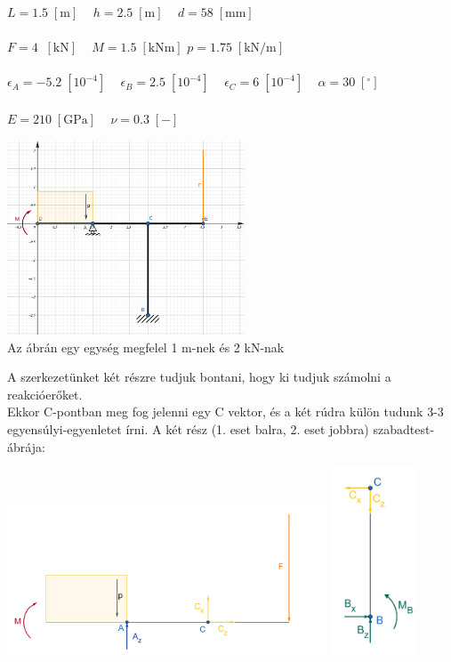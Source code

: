 \documentclass[10pt, a4paper]{article}
\newcommand{\adat}{\begin{trivlist}\item[\hskip \labelsep {\bfseries 
			{Adatok:}}]\end{trivlist}}
\newcommand{\egy}{\begin{trivlist}\item[\hskip \labelsep {\bfseries 
			{1. Feladat:}}]\end{trivlist}}
\newcommand{\knm}{\;\mathrm{\left[kNm\right]}}
\newcommand{\kn}{\;\mathrm{\left[kN\right]}}
\newcommand{\meter}{\mathrm{\left[m\right]}}
\newcommand{\pknm}{\mathrm{\left[kN/m\right]}}
\newcommand{\mm}{\mathrm{\left[mm\right]}}
\newcommand{\minegy}{\mathrm{\left[10^{-4}\right]}}
\newcommand{\dimnel}{\mathrm{\left[-\right]}}
\newcommand{\fok}{\mathrm{\left[^\circ\right]}}
\newcommand{\gpa}{\mathrm{\left[GPa\right]}}
\begin{document}
	
	\adat
	$ L = 1.5\;\meter \;\;\;$ $ h = 2.5\;\meter \;\;\;$ $ d = 58\;\mm$\\\\
	$ F = 4\;\kn \;\;\; $ $ M = 1.5\knm $ $ p = 1.75\;\pknm \;\;\;$\\\\
	$ \epsilon_A = -5.2\;\minegy \;\;\;$ $ \epsilon_B = 2.5\;\minegy \;\;\;$ $ \epsilon_C = 6\;\minegy \;\;\;$ $ \alpha = 30\;\fok \;\;\;$\\\\
	$ E = 210\;\gpa \;\;\;$ $ \nu = 0.3\;\dimnel \;\;\;$
	\setcounter{page}{1}
	\egy
	\begin{center}
		\includegraphics[width=200pt]{ meretarany.png }\\
		Az ábrán egy egység megfelel 1 m-nek és 2 kN-nak
	\end{center}
	A szerkezetünket két részre tudjuk bontani, hogy ki tudjuk számolni a reakcióerőket.\\
	Ekkor C-pontban meg fog jelenni egy C vektor, és a két rúdra külön tudunk 3-3 egyensúlyi-egyenletet írni.
	A két rész (1. eset balra, 2. eset jobbra) szabadtest-ábrája:
	\begin{center}
		\includegraphics[width=270pt]{ SZTA1.png }
		\includegraphics[width=70pt]{ SZTA2.png }
	\end{center}
\end{document}

